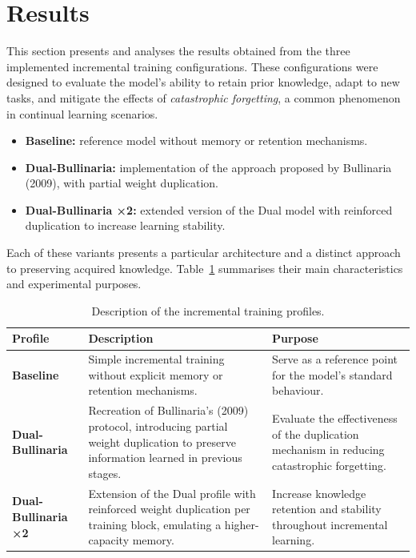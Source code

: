 \section{Results}

This section presents and analyses the results obtained from the three implemented incremental training configurations. These configurations were designed to evaluate the model’s ability to retain prior knowledge, adapt to new tasks, and mitigate the effects of \textit{catastrophic forgetting}, a common phenomenon in continual learning scenarios.

\begin{itemize}
  \item \textbf{Baseline:} reference model without memory or retention mechanisms.
  \item \textbf{Dual-Bullinaria:} implementation of the approach proposed by Bullinaria (2009), with partial weight duplication.
  \item \textbf{Dual-Bullinaria ×2:} extended version of the Dual model with reinforced duplication to increase learning stability.
\end{itemize}

Each of these variants presents a particular architecture and a distinct approach to preserving acquired knowledge. Table~\ref{tab:perfiles_incrementales} summarises their main characteristics and experimental purposes.

\begin{table}[H]
  \centering
  \renewcommand{\arraystretch}{1.3}
  \setlength{\tabcolsep}{6pt}
  \begin{tabular}{|p{3cm}|p{7cm}|p{5cm}|}
    \hline
    \textbf{Profile} & \textbf{Description} & \textbf{Purpose} \\ \hline
    \textbf{Baseline} & Simple incremental training without explicit memory or retention mechanisms. & Serve as a reference point for the model’s standard behaviour. \\ \hline
    \textbf{Dual-Bullinaria} & Recreation of Bullinaria’s (2009) protocol, introducing partial weight duplication to preserve information learned in previous stages. & Evaluate the effectiveness of the duplication mechanism in reducing catastrophic forgetting. \\ \hline
    \textbf{Dual-Bullinaria ×2} & Extension of the Dual profile with reinforced weight duplication per training block, emulating a higher-capacity memory. & Increase knowledge retention and stability throughout incremental learning. \\ \hline
  \end{tabular}
  \caption{Description of the incremental training profiles.}
  \label{tab:perfiles_incrementales}
\end{table}

